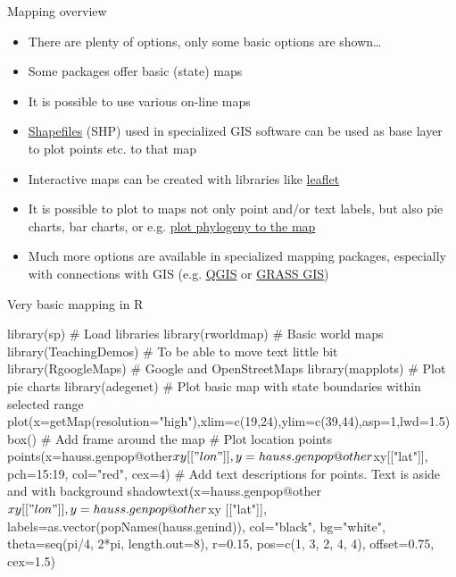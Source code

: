 \documentclass[compress, xelatex, 11pt, xcolor=svgnames, aspectratio=169,
	hyperref={
		bookmarks=true,
		unicode=true,
		colorlinks=true,
		pdftitle={Molecular data in R},
		plainpages=false,
		pdfauthor={Vojtech Zeisek},
		pdfsubject={Course about phylogeny and evolution in R},
		pdfcreator={XeLaTeX},
		pdfkeywords={R, evolution, phylogeny, molecular data},
		linkcolor=Crimson, %
		anchorcolor=Magenta, %
		citecolor=Magenta, %
		filecolor=Magenta, %
		menucolor=Magenta, %
		urlcolor=DodgerBlue, %
		},
	url={hyphens, lowtilde} %
	]{beamer}
\begin{document}
\begin{frame}{Mapping overview}
	\begin{itemize}
		\item There are plenty of options, only some basic options are shown\ldots
		\item Some packages offer basic (state) maps
		\item It is possible to use various on-line maps
		\item \href{https://en.wikipedia.org/wiki/Shapefile}{Shapefiles} (SHP) used in specialized GIS software can be used as base layer to plot points etc. to that map
		\item Interactive maps can be created with libraries like \href{https://CRAN.R-project.org/package=leaflet}{leaflet}
		\item It is possible to plot to maps not only point and/or text labels, but also pie charts, bar charts, or e.g. \href{http://blog.phytools.org/2019/03/projecting-phylogenetic-tree-onto-map.html}{plot phylogeny to the map}
		\item Much more options are available in specialized mapping packages, especially with connections with GIS (e.g. \href{https://qgis.org/}{QGIS} or \href{https://grass.osgeo.org/}{GRASS GIS})
	\end{itemize}
\end{frame}

\begin{frame}[fragile]{Very basic mapping in R}
	\begin{spluscode}
    library(sp) # Load libraries
    library(rworldmap) # Basic world maps
    library(TeachingDemos) # To be able to move text little bit
    library(RgoogleMaps) # Google and OpenStreetMaps
    library(mapplots) # Plot pie charts
    library(adegenet)
    # Plot basic map with state boundaries within selected range
    plot(x=getMap(resolution="high"),xlim=c(19,24),ylim=c(39,44),asp=1,lwd=1.5)
    box() # Add frame around the map
    # Plot location points
    points(x=hauss.genpop@other$xy[["lon"]], y=hauss.genpop@other$xy[["lat"]],
      pch=15:19, col="red", cex=4)
    # Add text descriptions for points. Text is aside and with background
    shadowtext(x=hauss.genpop@other$xy[["lon"]], y=hauss.genpop@other$xy
      [["lat"]], labels=as.vector(popNames(hauss.genind)), col="black",
      bg="white", theta=seq(pi/4, 2*pi, length.out=8), r=0.15, pos=c(1,
      3, 2, 4, 4), offset=0.75, cex=1.5)
	\end{spluscode}
\end{frame}
\end{document}
